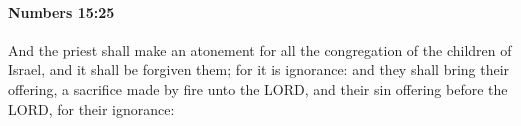 
		\paragraph{Numbers 15:25} %
			\label{NUMBERS-15-25}

			And the priest shall make an atonement for all the congregation of the children of Israel, and it shall be forgiven them; for it is ignorance: and they shall bring their offering, a sacrifice made by fire unto the LORD, and their sin offering before the LORD, for their ignorance:


